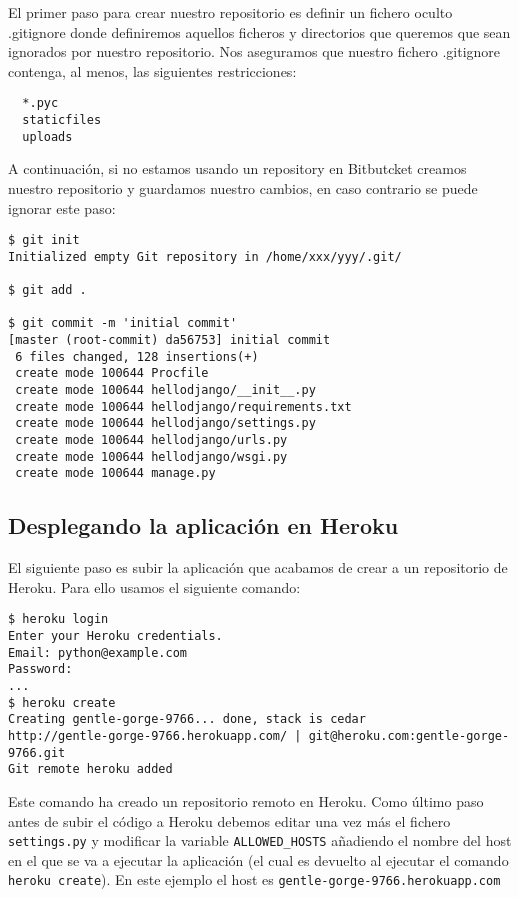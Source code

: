 \documentclass[12pt]{article} %
\begin{document}
El primer paso para crear nuestro repositorio es definir un fichero oculto .gitignore donde definiremos aquellos ficheros y directorios que queremos que sean ignorados por nuestro repositorio. Nos aseguramos que nuestro fichero .gitignore contenga, al menos, las siguientes restricciones:

\begin{verbatim}
  *.pyc
  staticfiles
  uploads
\end{verbatim}

A continuación, si no estamos usando un repository en Bitbutcket  creamos nuestro repositorio y guardamos nuestro cambios, en caso contrario se puede ignorar este paso:

\begin{verbatim}
$ git init 
Initialized empty Git repository in /home/xxx/yyy/.git/ 
 
$ git add . 
 
$ git commit -m 'initial commit'
[master (root-commit) da56753] initial commit 
 6 files changed, 128 insertions(+) 
 create mode 100644 Procfile 
 create mode 100644 hellodjango/__init__.py 
 create mode 100644 hellodjango/requirements.txt 
 create mode 100644 hellodjango/settings.py 
 create mode 100644 hellodjango/urls.py 
 create mode 100644 hellodjango/wsgi.py 
 create mode 100644 manage.py 
\end{verbatim}

\subsection{Desplegando la aplicación en Heroku}

 El siguiente paso es subir la aplicación que acabamos de crear a un repositorio de Heroku. Para ello usamos el siguiente comando:

 \begin{verbatim}
$ heroku login
Enter your Heroku credentials.
Email: python@example.com
Password:
...
$ heroku create 
Creating gentle-gorge-9766... done, stack is cedar 
http://gentle-gorge-9766.herokuapp.com/ | git@heroku.com:gentle-gorge-9766.git 
Git remote heroku added
 \end{verbatim}

Este comando ha creado un repositorio remoto en Heroku. Como último paso antes de subir el código a Heroku debemos editar una vez más el fichero \texttt{settings.py} y modificar la variable \texttt{ALLOWED\_HOSTS} añadiendo el nombre del
host en el que se va a ejecutar la aplicación (el cual es devuelto al ejecutar el comando \texttt{heroku create}). En este ejemplo el host es \texttt{gentle-gorge-9766.herokuapp.com}
\end{document}
